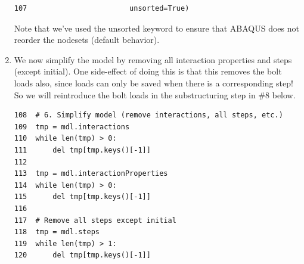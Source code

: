 \documentclass[11pt]{article}
\begin{document}
\begin{enumerate}
\begin{verbatim}
107                        unsorted=True)
\end{verbatim}
Note that we've used the unsorted keyword to ensure that ABAQUS does not reorder the nodesets (default behavior).
\item We now simplify the model by removing all interaction properties and steps (except initial).
One side-effect of doing this is that this removes the bolt loads also, since loads can only be saved when there is a corresponding step!
So we will reintroduce the bolt loads in the substructuring step in \#8 below.
\begin{verbatim}
108  # 6. Simplify model (remove interactions, all steps, etc.)
109  tmp = mdl.interactions
110  while len(tmp) > 0:
111      del tmp[tmp.keys()[-1]]
112  
113  tmp = mdl.interactionProperties
114  while len(tmp) > 0:
115      del tmp[tmp.keys()[-1]]
116  
117  # Remove all steps except initial
118  tmp = mdl.steps
119  while len(tmp) > 1:
120      del tmp[tmp.keys()[-1]]
\end{verbatim}
\end{enumerate}
\end{document}
